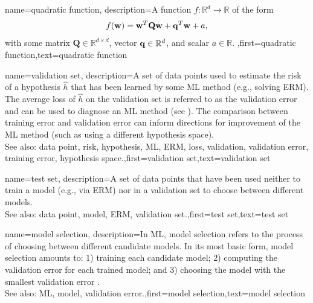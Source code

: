 {name={quadratic function},
	description={A function $f: \mathbb{R}^{d} \rightarrow \mathbb{R}$ of the form 
	$$f({\bf w}) =  {\bf w}^{T} \mathbf{Q} \mathbf{w} + \mathbf{q}^{T} {\bf w}+a,$$ with 
	some matrix $\mathbf{Q} \in \mathbb{R}^{d \times d}$, vector ${\bf q} \in \mathbb{R}^{d}$, 
	and scalar $a \in \mathbb{R}$. },first={quadratic function},text={quadratic function}  
}

{name={validation set},
  description={A set of data points used to estimate 
  	the risk of a hypothesis $\hat{h}$ that has been learned by some 
  	ML method (e.g., solving ERM). The average loss of $\hat{h}$ 
  	on the validation set is referred to as the validation error and can be used to diagnose an 
  	ML method (see \cite[Sec. 6.6]{MLBasics}). The comparison between training error 
  	and validation error can inform directions for improvement of the ML method (such as 
  	using a different hypothesis space).
			\\
		See also: data point, risk, hypothesis, ML, ERM, loss, validation, validation error, training error, hypothesis space.},first={validation set},text={validation set}  
}

{name={test set},
	description={A set of data points that have  
		been used neither to train a model (e.g., via ERM) nor in a validation set 
		to choose between different models.
				\\
		See also: data point, model, ERM, validation set.},first={test set},text={test set}  
}


{name={model selection},
	description={In ML, model selection refers to the 
		process of choosing between different candidate models. In its most 
		basic form, model selection amounts to: 1) training each candidate model; 
		2) computing the validation error for each trained model; and 3) choosing the model 
		with the smallest validation error \cite[Ch. 6]{MLBasics}. 
				\\
		See also: ML, model, validation error.},first={model selection},text={model selection}  
}






